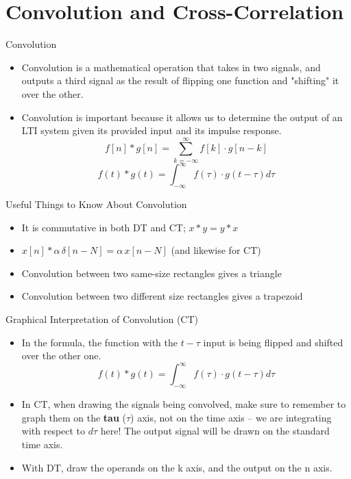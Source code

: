 \section{Convolution and Cross-Correlation}

\begin{frame}{Convolution}
    \begin{itemize}
        \item Convolution is a mathematical operation that takes in two signals, and outputs a third signal as the result of flipping one function and "shifting" it over the other. 

        \item Convolution is important because it allows us to determine the output of an LTI system given its provided input and its impulse response. 
            \[
                f[n]*g[n] = \sum_{k=-\infty}^{\infty} f[k]\cdot g[n-k]
            \]
            \[
                f(t)*g(t) = \int_{-\infty}^{\infty} f(\tau) \cdot g(t- \tau) d\tau
            \]
    \end{itemize}
\end{frame}

\begin{frame}{Useful Things to Know About Convolution}
    \begin{itemize}
        \item It is commutative in both DT and CT; $x*y = y*x$ 
        \item $x[n] * \alpha\,\delta[n-N] = \alpha\, x[n-N]$ (and likewise for CT)
        \item Convolution between two same-size rectangles gives a triangle
        \item Convolution between two different size rectangles gives a trapezoid
    \end{itemize}
\end{frame}

\begin{frame}{Graphical Interpretation of Convolution (CT)}
    \begin{itemize}
        \item In the formula, the function with the $t-\tau$ input is being flipped and shifted over the other one.
            \[
                f(t)*g(t) = \int_{-\infty}^{\infty} f(\tau) \cdot g(t- \tau) d\tau
            \]
        \item In CT, when drawing the signals being convolved, make sure to remember to graph them on the \textbf{tau} ($\tau$) axis, not on the time axis -- we are integrating with respect to $d\tau$ here! The output signal will be drawn on the standard time axis. 
        \item With DT, draw the operands on the k axis, and the output on the n axis. 
    \end{itemize}
\end{frame}

